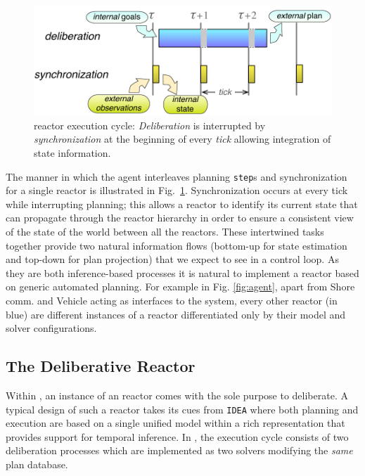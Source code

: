 \begin{figure}[!htbp]
  \centering
  \vskip-1pc
  \includegraphics[width=0.55\columnwidth]{figs/tick-cycle}
  \caption{\small \rx reactor execution cycle: {\em Deliberation} is
    interrupted by {\em synchronization} at the beginning of every
    {\em tick} allowing integration of state information.}
  \label{fig:tick-exec}
  \vskip-0.8pc
\end{figure}

The manner in which the agent interleaves planning \texttt{step}s and
synchronization for a single reactor is illustrated in
Fig.~\ref{fig:tick-exec}. Synchronization occurs at every tick while
interrupting planning; this allows a reactor to identify its current
state that can propagate through the reactor hierarchy in order to
ensure a consistent view of the state of the world between all the
reactors.
These intertwined tasks together provide two natural information flows
(bottom-up for state estimation and top-down for plan projection) that
we expect to see in a control loop. As they are both inference-based
processes it is natural to implement a reactor based on generic
automated planning. For example in Fig. \ref{fig:agent}, apart from
\textsf{Shore comm.} and \textsf{Vehicle} acting as interfaces to the
system, every other reactor (in blue) are different instances of a \eu
reactor differentiated only by their model and \eu solver
configurations.

\subsection{The  \eu Deliberative Reactor}
\label{sec:arch:europa}

Within \rx, an instance of an \eu reactor comes with the sole purpose
to deliberate. A typical design of such a reactor takes its cues from
\texttt{IDEA} \cite{mus02, mus06} where both planning and execution
are based on a single unified model within a rich representation that
provides support for temporal inference. In \rx, the execution cycle
consists of two deliberation processes which are implemented as two
\eu solvers modifying the \emph{same} plan database. %

